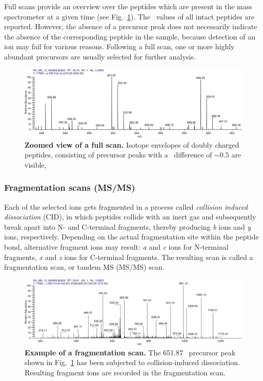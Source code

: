 Full scans provide an overview over the peptides which are present in the
mass spectrometer at a given time (see Fig.~\ref{fig:full-scan}).
The \mz~values of all intact peptides are reported.
However, the absence of a precursor peak does not necessarily indicate the
absence of the corresponding peptide in the sample, because detection of
an ion may fail for various reasons.
Following a full scan, one or more highly abundant precursors are usually
selected for further analysis.

\begin{figure}[h]
\includegraphics[width=\textwidth]{figures/ms1-scan.jpg}
\caption{
{\bf Zoomed view of a full scan.}
Isotope envelopes of doubly charged peptides, consisting of precursor
peaks with a \mz~difference of $\sim0.5$ are visible,
}
\label{fig:full-scan}
\end{figure}

\subsubsection{Fragmentation scans (MS/MS)}

Each of the selected ions gets fragmented in a process called
{\em collision induced dissociation} (CID), in which peptides collide with an
inert gas and subsequently break apart into N- and C-terminal fragments,
thereby producing {\em b} ions and {\em y} ions, respectively. 
Depending on the actual fragmentation site within the peptide bond,
alternative fragment ions may result: {\em a} and {\em c} ions for N-terminal
fragments, {\em x} and {\em z} ions for C-terminal fragments.
The resulting scan is called a fragmentation scan, or tandem MS (MS/MS) scan.

\begin{figure}[h]
\includegraphics[width=\textwidth]{figures/ms2-scan.jpg}
\caption{
{\bf Example of a fragmentation scan.} 
The 651.87 \mz~precursor peak shown in Fig.~\ref{fig:full-scan} has been
subjected to collision-induced dissociation.
Resulting fragment ions are recorded in the fragmentation scan.
}
\label{fig:fragmentation-scan}
\end{figure}

